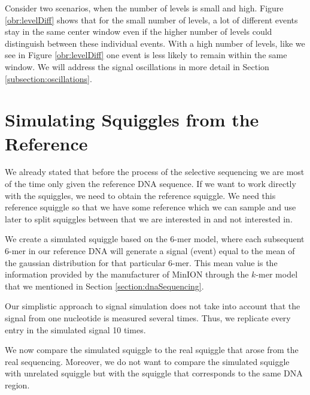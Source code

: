 Consider two scenarios, when the number of levels is small and high.
Figure \ref{obr:levelDiff} shows that for the small number of levels, a lot of
different events stay in the same center window even if the higher number of levels
could distinguish between these individual events. With a high number of levels,
like we see in Figure \ref{obr:levelDiff} one event is less likely to remain within the same window.
We will address the signal oscillations in more detail in Section \ref{subsection:oscillations}.

\section{Simulating Squiggles from the Reference}
\label{section:simulateSquiggle}

We already stated that before the process of the selective sequencing we are most
of the time only given the reference DNA sequence. If we want to work directly with the squiggles,
we need to obtain the reference squiggle. We need this reference squiggle
so that we have some reference which we can sample and use later to split squiggles
between that we are interested in and not interested in.

We create a simulated squiggle based on the 6-mer model,
where each subsequent 6-mer in our reference DNA will generate a signal (event) equal to
the mean of the gaussian distribution for that particular 6-mer. This mean value
is the information provided by the manufacturer of MinION through the $k$-mer model
that we mentioned in Section \ref{section:dnaSequencing}.

Our simplistic approach to signal simulation does not take into account that the
signal from one nucleotide is measured several times. Thus, we replicate every entry in the simulated signal
10 times.

We now compare the simulated squiggle to the real squiggle that arose from the real
sequencing. Moreover, we do not want to compare the simulated squiggle with unrelated squiggle
but with the squiggle that corresponds to the same DNA region.

